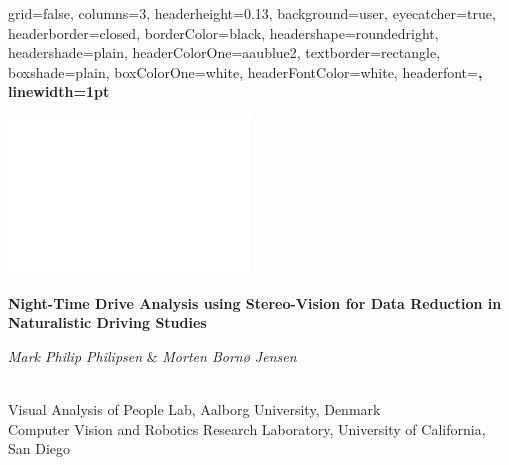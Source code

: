 \documentclass[paperwidth=48in,paperheight=42in,landscape]{preambles/baposter}
\begin{document}
\begin{poster}{
  grid=false,
  columns=3,
  headerheight=0.13\textheight,
  background=user,
  eyecatcher=true,
  headerborder=closed,
  borderColor=black,
  headershape=roundedright,
  headershade=plain,
  headerColorOne=aaublue2,
  textborder=rectangle,
  boxshade=plain,
  boxColorOne=white,
  headerFontColor=white,
  headerfont=\Large\sf\bf,
  linewidth=1pt
}
{

  \includegraphics[height=0.75\headerheight]{preambles/aau_logo_new_neg}
 
 
}
{\color{white}\bf
  Night-Time Drive Analysis using Stereo-Vision for Data Reduction in Naturalistic Driving Studies
}
{\color{white}\small
  \vspace{0.7em} \begin{large} \textit{Mark Philip Philipsen} \& \textit{Morten Bornø Jensen} \end{large} \\[0.7em]
Visual Analysis of People Lab, Aalborg University, Denmark \\
Computer Vision and Robotics Research Laboratory, University of California, San Diego

}
{
 
}
\end{poster}
\end{document}
